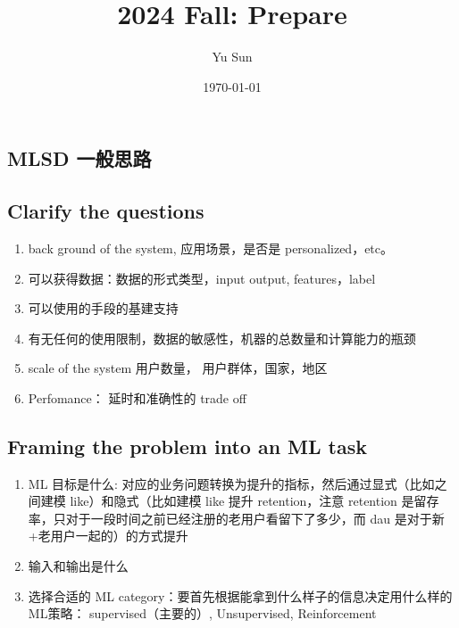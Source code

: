 \documentclass[12pt]{article}
\numberwithin{theorem}{section} %
\numberwithin{definition}{section} %
\numberwithin{assumption}{section} %
\numberwithin{lemma}{section} %
\numberwithin{remark}{section} %
\numberwithin{prop}{section} %
\numberwithin{corollary}{section} %
\numberwithin{example}{section} %
\numberwithin{question}{section} %
\numberwithin{problem}{section} %
\numberwithin{conjecture}{section} %
\numberwithin{append}{section} %
\numberwithin{property}{section} %
\begin{document}
	\title{2024 Fall: Prepare}
	\author{Yu Sun}
	
	
	\date{\today}
	\maketitle
	\vspace{-1em}
	
	\begin{CJK}{UTF8}{gbsn}  
	
	\setcounter{section}{0}
	\section{MLSD 一般思路}
	\subsection{Clarify the questions}
	\begin{enumerate}
		\item back ground of the system, 应用场景，是否是 personalized，etc。
		\item 可以获得数据：数据的形式类型，input output, features，label
		\item 可以使用的手段的基建支持
		\item 有无任何的使用限制，数据的敏感性，机器的总数量和计算能力的瓶颈
		\item scale of the system 用户数量， 用户群体，国家，地区
		\item Perfomance： 延时和准确性的 trade off
	\end{enumerate}
	\subsection{Framing the problem into an ML task}		
	\begin{enumerate}
		\item ML 目标是什么: 对应的业务问题转换为提升的指标，然后通过显式（比如之间建模 like）和隐式（比如建模 like 提升 retention，注意 retention 是留存率，只对于一段时间之前已经注册的老用户看留下了多少，而 dau 是对于新+老用户一起的）的方式提升
		\item 输入和输出是什么
		\item 选择合适的 ML category：要首先根据能拿到什么样子的信息决定用什么样的 ML策略： supervised（主要的）, Unsupervised,  Reinforcement
	\end{enumerate}

\end{CJK}
\end{document}
